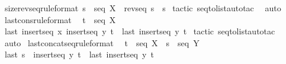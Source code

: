 \begin{isabellebody}
\isanewline
\isanewline
{}\isamarkupfalse%
\ size{\isacharunderscore}revseq{\isacharbrackleft}rule{\isacharunderscore}format{\isacharbrackright}{\isacharcolon}\ {\isachardoublequoteopen}s\ {\isacharcolon}\ seq\ X\ {\isacharminus}{\isacharminus}{\isachargreater}\ {\isacharhash}{\isacharparenleft}revseq\ s{\isacharparenright}\ {\isacharequal}\ {\isacharhash}s{\isachardoublequoteclose}\isanewline
%
\isadelimproof
%
\endisadelimproof
%
\isatagproof
{}\isamarkupfalse%
\ {\isacharparenleft}tactic\ {\isacharverbatimopen}seq{\isacharunderscore}to{\isacharunderscore}list{\isacharunderscore}auto{\isacharunderscore}tac\ {}{\isacharverbatimclose}{\isacharparenright}\isanewline
{}\isamarkupfalse%
\ auto\isanewline
{}\isamarkupfalse%
%
\endisatagproof
{\isafoldproof}%
%
\isadelimproof
\isanewline
%
\endisadelimproof
\isanewline
\isanewline
\isanewline
\isanewline
\isanewline
\isanewline
\isanewline
\isanewline
{}\isamarkupfalse%
\ last{\isacharunderscore}cons{\isacharbrackleft}rule{\isacharunderscore}format{\isacharbrackright}\ {\isacharcolon}\ \isanewline
{\isachardoublequoteopen}t\ {\isacharcolon}\ seq\ X\ {\isacharminus}{\isacharminus}{\isachargreater}\ \ \isanewline
\ {\isacharparenleft}last\ {\isacharparenleft}insertseq\ x\ {\isacharparenleft}insertseq\ y\ t{\isacharparenright}{\isacharparenright}{\isacharparenright}\ {\isacharequal}\ {\isacharparenleft}last\ {\isacharparenleft}insertseq\ y\ t{\isacharparenright}{\isacharparenright}{\isachardoublequoteclose}\isanewline
%
\isadelimproof
%
\endisadelimproof
%
\isatagproof
{}\isamarkupfalse%
\ {\isacharparenleft}tactic\ {\isacharverbatimopen}seq{\isacharunderscore}to{\isacharunderscore}list{\isacharunderscore}auto{\isacharunderscore}tac\ {}{\isacharverbatimclose}{\isacharparenright}\isanewline
{}\isamarkupfalse%
\ auto\isanewline
{}\isamarkupfalse%
%
\endisatagproof
{\isafoldproof}%
%
\isadelimproof
\isanewline
%
\endisadelimproof
\isanewline
\isanewline
{}\isamarkupfalse%
\ last{\isacharunderscore}concatseq{\isacharbrackleft}rule{\isacharunderscore}format{\isacharbrackright}\ {\isacharcolon}\ \isanewline
{\isachardoublequoteopen}t\ {\isacharcolon}\ seq\ X\ {\isacharminus}{\isacharminus}{\isachargreater}\ s\ {\isacharcolon}\ seq\ Y\ {\isacharminus}{\isacharminus}{\isachargreater}\ \ \isanewline
\ {\isacharparenleft}last\ {\isacharparenleft}s\ {\isacharpercent}{\isacharampersand}{\isacharcircum}\ {\isacharparenleft}insertseq\ y\ t{\isacharparenright}{\isacharparenright}{\isacharparenright}\ {\isacharequal}\ {\isacharparenleft}last\ {\isacharparenleft}insertseq\ y\ t{\isacharparenright}{\isacharparenright}{\isachardoublequoteclose}\isanewline

\end{isabellebody}
